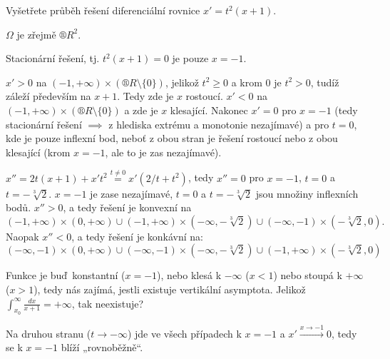 \documentclass[12pt]{article}					%
\begin{document}
\begin{priklad}
	Vyšetřete průběh řešení diferenciální rovnice $x' = t^2(x + 1)$.

	\begin{reseni}
		$\Omega$ je zřejmě $®R^2$.

		Stacionární řešení, tj. $t^2(x + 1) = 0$ je pouze $x = -1$.

		$x' > 0$ na $(-1, +∞)\times (®R \setminus \{0\})$, jelikož $t^2 ≥ 0$ a krom 0 je $t^2 > 0$, tudíž záleží především na $x + 1$. Tedy zde je $x$ rostoucí. $x' < 0$ na $(-1, +∞) \times (®R \setminus \{0\})$ a zde je $x$ klesající. Nakonec $x' = 0$ pro $x = -1$ (tedy stacionární řešení $\implies$ z hlediska extrému a monotonie nezajímavé) a pro $t = 0$, kde je pouze inflexní bod, neboť z obou stran je řešení rostoucí nebo z obou klesající (krom $x = -1$, ale to je zas nezajímavé).

		$x'' = 2t(x + 1) + x't^2 \stackrel{t ≠ 0}{=} x'(2/t + t^2)$, tedy $x'' = 0$ pro $x = -1$, $t = 0$ a $t = -\sqrt[3]{2}$. $x = -1$ je zase nezajímavé, $t = 0$ a $t = -\sqrt[3]{2}$ jsou množiny inflexních bodů. $x'' > 0$, a tedy řešení je konvexní na
		$$ (-1, +∞) \times (0, +∞) \cup (-1, +∞) \times (-∞, -\sqrt[3]{2}) \cup (-∞, -1) \times (-\sqrt[3]{2}, 0). $$
		Naopak $x'' < 0$, a tedy řešení je konkávní na:
		$$ (-∞, -1) \times (0, +∞) \cup (-∞, -1) \times (-∞, -\sqrt[3]{2}) \cup (-1, +∞) \times (-\sqrt[3]{2}, 0) $$

		Funkce je buď konstantní ($x = -1$), nebo klesá k $-∞$ ($x < 1$) nebo stoupá k $+∞$ ($x > 1$), tedy nás zajímá, jestli existuje vertikální asymptota. Jelikož $\int_{x_0}^∞ \frac{dx}{x+1} = +∞$, tak neexistuje?

		Na druhou stranu ($t \rightarrow -∞$) jde ve všech případech k $x = -1$ a $x' \overset{x \rightarrow -1}\rightarrow 0$, tedy se k $x = -1$ blíží „rovnoběžně“.
	\end{reseni}
\end{priklad}
\end{document}
